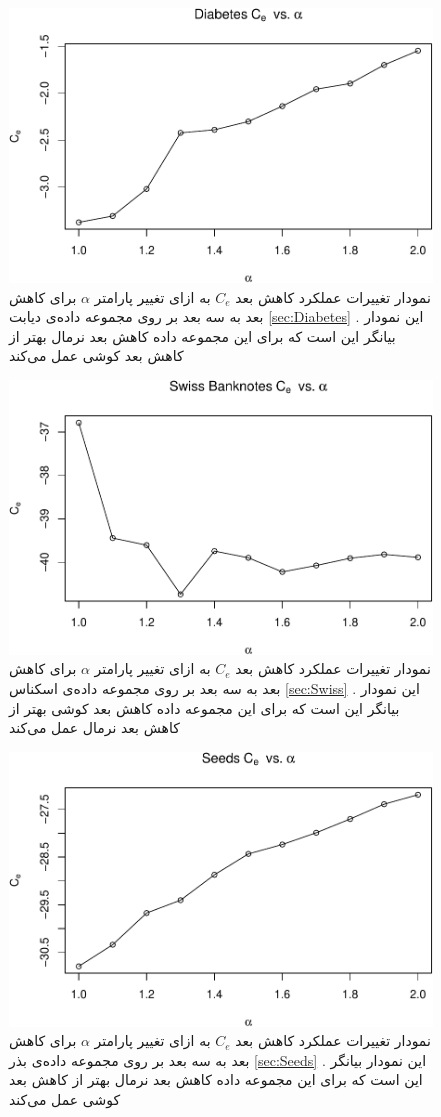 \begin{figure}[H]
\centering
\includegraphics[width=0.7\linewidth]{Report_files/figure-latex/unnamed-chunk-22-3}
\caption{
نمودار تغییرات عملکرد کاهش بعد 
$C_e$
به ازای تغییر پارامتر
$\alpha$
برای کاهش بعد به 
سه بعد بر روی مجموعه داده‌‌‌ی 
دیابت
\ref{sec:Diabetes}
. این نمودار بیانگر این است که برای این مجموعه داده کاهش بعد 
نرمال
بهتر از کاهش بعد 
کوشی 
عمل می‌کند
}
\end{figure}

\begin{figure}[H]
\centering
\includegraphics[width=0.7\linewidth]{Report_files/figure-latex/unnamed-chunk-22-4}
\caption{
نمودار تغییرات عملکرد کاهش بعد 
$C_e$
به ازای تغییر پارامتر
$\alpha$
برای کاهش بعد به 
سه بعد بر روی مجموعه داده‌‌‌ی 
اسکناس
\ref{sec:Swiss}
. این نمودار بیانگر این است که برای این مجموعه داده کاهش بعد 
کوشی 
بهتر از کاهش بعد 
نرمال
عمل می‌کند
}
\end{figure}

\begin{figure}[H]
\centering
\includegraphics[width=0.7\linewidth]{Report_files/figure-latex/unnamed-chunk-22-5}
\caption{
نمودار تغییرات عملکرد کاهش بعد 
$C_e$
به ازای تغییر پارامتر
$\alpha$
برای کاهش بعد به 
سه بعد بر روی مجموعه داده‌‌‌ی 
بذر
\ref{sec:Seeds}
. این نمودار بیانگر این است که برای این مجموعه داده کاهش بعد 
نرمال
بهتر از کاهش بعد 
کوشی 
عمل می‌کند
}
\end{figure}

